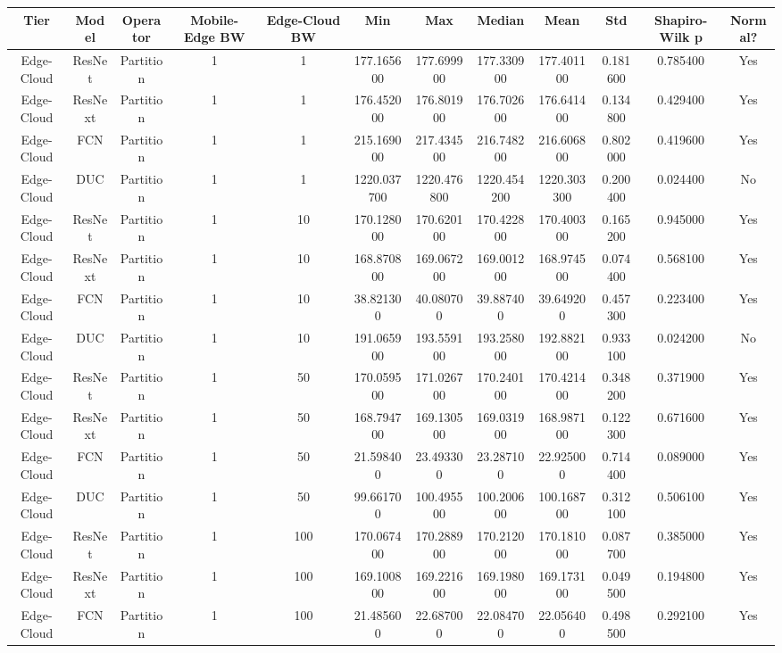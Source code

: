 \begin{tabular}{|c||c||c||c||c||c||c||c||c||c||c||c|}
\toprule
Tier & Model & Operator & Mobile-Edge BW & Edge-Cloud BW & Min & Max & Median & Mean & Std & Shapiro-Wilk p & Normal? \\
\midrule
Edge-Cloud & ResNet & Partition & 1 & 1 & 177.165600 & 177.699900 & 177.330900 & 177.401100 & 0.181600 & 0.785400 & Yes \\
Edge-Cloud & ResNext & Partition & 1 & 1 & 176.452000 & 176.801900 & 176.702600 & 176.641400 & 0.134800 & 0.429400 & Yes \\
Edge-Cloud & FCN & Partition & 1 & 1 & 215.169000 & 217.434500 & 216.748200 & 216.606800 & 0.802000 & 0.419600 & Yes \\
Edge-Cloud & DUC & Partition & 1 & 1 & 1220.037700 & 1220.476800 & 1220.454200 & 1220.303300 & 0.200400 & 0.024400 & No \\
Edge-Cloud & ResNet & Partition & 1 & 10 & 170.128000 & 170.620100 & 170.422800 & 170.400300 & 0.165200 & 0.945000 & Yes \\
Edge-Cloud & ResNext & Partition & 1 & 10 & 168.870800 & 169.067200 & 169.001200 & 168.974500 & 0.074400 & 0.568100 & Yes \\
Edge-Cloud & FCN & Partition & 1 & 10 & 38.821300 & 40.080700 & 39.887400 & 39.649200 & 0.457300 & 0.223400 & Yes \\
Edge-Cloud & DUC & Partition & 1 & 10 & 191.065900 & 193.559100 & 193.258000 & 192.882100 & 0.933100 & 0.024200 & No \\
Edge-Cloud & ResNet & Partition & 1 & 50 & 170.059500 & 171.026700 & 170.240100 & 170.421400 & 0.348200 & 0.371900 & Yes \\
Edge-Cloud & ResNext & Partition & 1 & 50 & 168.794700 & 169.130500 & 169.031900 & 168.987100 & 0.122300 & 0.671600 & Yes \\
Edge-Cloud & FCN & Partition & 1 & 50 & 21.598400 & 23.493300 & 23.287100 & 22.925000 & 0.714400 & 0.089000 & Yes \\
Edge-Cloud & DUC & Partition & 1 & 50 & 99.661700 & 100.495500 & 100.200600 & 100.168700 & 0.312100 & 0.506100 & Yes \\
Edge-Cloud & ResNet & Partition & 1 & 100 & 170.067400 & 170.288900 & 170.212000 & 170.181000 & 0.087700 & 0.385000 & Yes \\
Edge-Cloud & ResNext & Partition & 1 & 100 & 169.100800 & 169.221600 & 169.198000 & 169.173100 & 0.049500 & 0.194800 & Yes \\
Edge-Cloud & FCN & Partition & 1 & 100 & 21.485600 & 22.687000 & 22.084700 & 22.056400 & 0.498500 & 0.292100 & Yes \\

\end{tabular}
